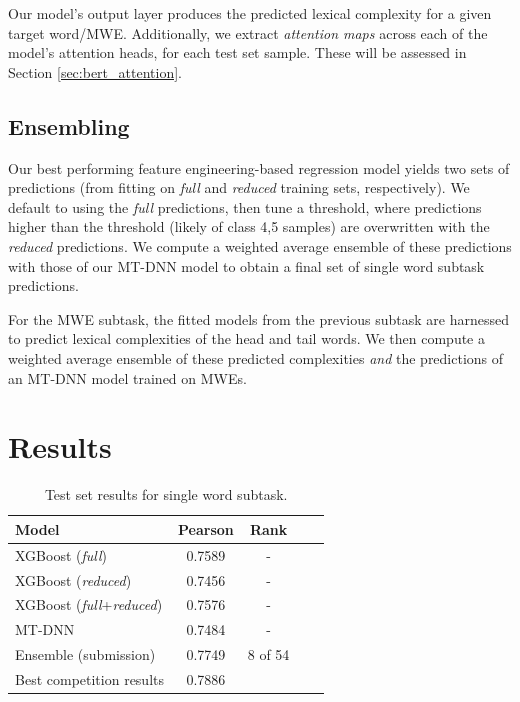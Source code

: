 \documentclass[11pt,a4paper]{article}
\begin{document}
Our model's output layer produces the predicted lexical complexity for a given target word/MWE. Additionally, we extract \textit{attention maps} across each of the model's attention heads, for each test set sample. These will be assessed in Section \ref{sec:bert_attention}.

\subsection{Ensembling}

Our best performing feature engineering-based regression model yields two sets of predictions (from fitting on \textit{full} and \textit{reduced} training sets, respectively). We default to using the \textit{full} predictions, then tune a threshold, where predictions higher than the threshold (likely of class 4,5 samples) are overwritten with the \textit{reduced} predictions. We compute a weighted average ensemble of these predictions with those of our MT-DNN model to obtain a final set of single word subtask predictions. 

For the MWE subtask, the fitted models from the previous subtask are harnessed to predict lexical complexities of the head and tail words. We then compute a weighted average ensemble of these predicted complexities \textit{and} the predictions of an MT-DNN model trained on MWEs.

\section{Results}

\begin{table}
  \centering
  \begin{tabular}{lcccc}
  \hline \textbf{Model} & \textbf{Pearson} & \textbf{Rank} & \\ \hline
  XGBoost (\textit{full}) &	0.7589 & - \\
  XGBoost (\textit{reduced}) &	0.7456 & - \\
  XGBoost (\textit{full}+\textit{reduced}) & 0.7576 & - \\
  MT-DNN & 0.7484 & - \\
  Ensemble (submission) & 0.7749 & 8 of 54 \\
  \hline
  Best competition results & 0.7886 & \\ 
  \hline
  \end{tabular}
  \caption{\label{tab:single-word-results} Test set results for single word subtask.}
\end{table}
\end{document}
